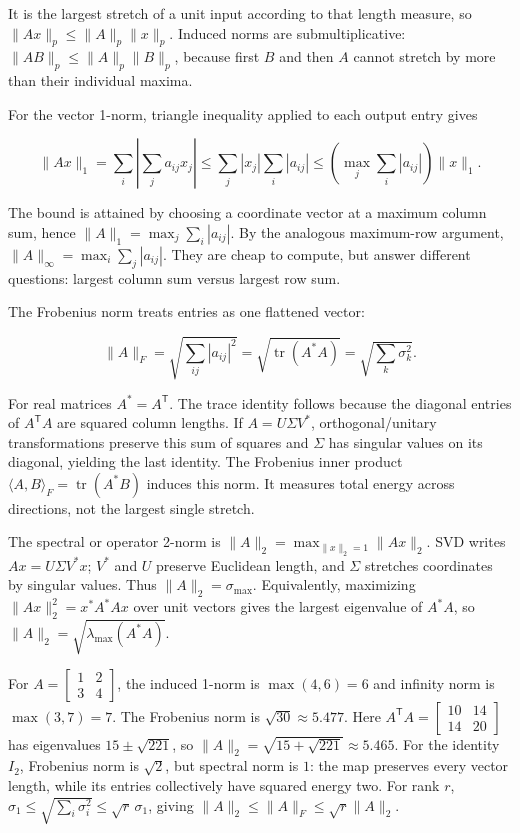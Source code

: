 It is the largest stretch of a unit input according to that length measure, so \(\|Ax\|_p\le\|A\|_p\|x\|_p\). Induced norms are submultiplicative: \(\|AB\|_p\le\|A\|_p\|B\|_p\), because first \(B\) and then \(A\) cannot stretch by more than their individual maxima.

For the vector 1-norm, triangle inequality applied to each output entry gives

\[
\|Ax\|_1=\sum_i\left|\sum_j a_{ij}x_j\right|
\le\sum_j |x_j|\sum_i|a_{ij}|
\le \left(\max_j\sum_i|a_{ij}|\right)\|x\|_1.
\]

The bound is attained by choosing a coordinate vector at a maximum column sum, hence \(\|A\|_1=\max_j\sum_i|a_{ij}|\). By the analogous maximum-row argument, \(\|A\|_\infty=\max_i\sum_j|a_{ij}|\). They are cheap to compute, but answer different questions: largest column sum versus largest row sum.

The Frobenius norm treats entries as one flattened vector:

\[
\|A\|_F=\sqrt{\sum_{ij}|a_{ij}|^2}
=\sqrt{\operatorname{tr}(A^*A)}
=\sqrt{\sum_k\sigma_k^2}.
\]

For real matrices \(A^*=A^\mathsf T\). The trace identity follows because the diagonal entries of \(A^\mathsf TA\) are squared column lengths. If \(A=U\Sigma V^*\), orthogonal/unitary transformations preserve this sum of squares and \(\Sigma\) has singular values on its diagonal, yielding the last identity. The Frobenius inner product \(\langle A,B\rangle_F=\operatorname{tr}(A^*B)\) induces this norm. It measures total energy across directions, not the largest single stretch.

The spectral or operator 2-norm is \(\|A\|_2=\max_{\|x\|_2=1}\|Ax\|_2\). SVD writes \(Ax=U\Sigma V^*x\); \(V^*\) and \(U\) preserve Euclidean length, and \(\Sigma\) stretches coordinates by singular values. Thus \(\|A\|_2=\sigma_{\max}\). Equivalently, maximizing \(\|Ax\|_2^2=x^*A^*Ax\) over unit vectors gives the largest eigenvalue of \(A^*A\), so \(\|A\|_2=\sqrt{\lambda_{\max}(A^*A)}\).

For \(A=\begin{bmatrix}1&2\\3&4\end{bmatrix}\), the induced 1-norm is \(\max(4,6)=6\) and infinity norm is \(\max(3,7)=7\). The Frobenius norm is \(\sqrt{30}\approx5.477\). Here \(A^\mathsf TA=\begin{bmatrix}10&14\\14&20\end{bmatrix}\) has eigenvalues \(15\pm\sqrt{221}\), so \(\|A\|_2=\sqrt{15+\sqrt{221}}\approx5.465\). For the identity \(I_2\), Frobenius norm is \(\sqrt2\), but spectral norm is \(1\): the map preserves every vector length, while its entries collectively have squared energy two. For rank \(r\), \(\sigma_1\le\sqrt{\sum_i\sigma_i^2}\le\sqrt r\,\sigma_1\), giving \(\|A\|_2\le\|A\|_F\le\sqrt r\|A\|_2\).

